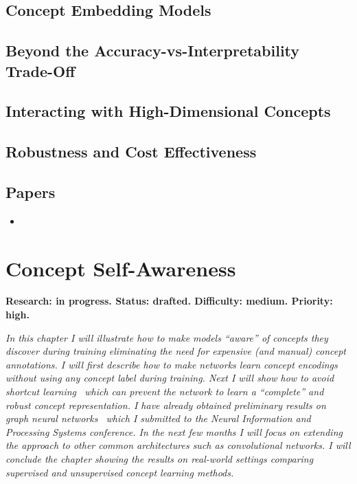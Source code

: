 \documentclass[withindex,glossary]{cam-thesis}
\begin{document}
\section{Concept Embedding Models}

\section{Beyond the Accuracy-vs-Interpretability Trade-Off}

\section{Interacting with High-Dimensional Concepts}

\section{Robustness and Cost Effectiveness}

\section*{Papers}
\nobibliography*
\begin{itemize}
    \item {}
\end{itemize}


\chapter{Concept Self-Awareness} \label{chapter:unsupervised}
\textbf{Research: in progress. Status: drafted. Difficulty: medium. Priority: high.}

\textit{In this chapter I will illustrate how to make models ``aware'' of concepts they discover during training eliminating the need for expensive (and manual) concept annotations. I will first describe how to make networks learn concept encodings without using any concept label during training. Next I will show how to avoid \textit{shortcut learning}~\citep{geirhos2020shortcut} which can prevent the network to learn a ``complete'' and robust concept representation. I have already obtained preliminary results on graph neural networks~\citep{magister2022encoding} which I submitted to the Neural Information and Processing Systems conference. In the next few months I will focus on extending the approach to other common architectures such as convolutional networks. I will conclude the chapter showing the results on real-world settings comparing supervised and unsupervised concept learning methods.}
\end{document}
